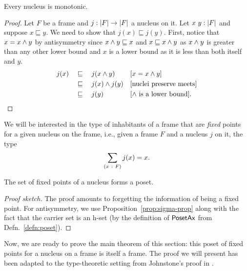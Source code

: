 \begin{prop}\label{prop:nucleus-mono}
  Every nucleus is monotonic.
\end{prop}
\begin{proof}
  Let $F$ be a frame and $j : \left| F \right| \rightarrow \left| F \right|$ a nucleus on it. Let
  $x~y:\left| F \right|$ and suppose $x \sqsubseteq y$. We need to show that $j(x) \sqsubseteq j(y)$. First,
  notice that $x = x \wedge y$ by antisymmetry since $x \wedge y \sqsubseteq x$ and $x \sqsubseteq
  x \wedge y$ as $x \wedge y$ is greater than any other lower bound and $x$ is a lower
  bound as it is less than both itself and $y$.
  \begin{align*}
    j(x) &\quad\sqsubseteq\quad j(x \wedge y)                 && [x = x \wedge y]                      \\
         &\quad\sqsubseteq\quad j(x) \wedge j(y)              && [\text{nuclei preserve meets}]         \\
         &\quad\sqsubseteq\quad {j(y)}                         && [\text{$\wedge$ is a lower bound}]  .
  \end{align*}
\end{proof}

We will be interested in the type of inhabitants of a frame that are \emph{fixed} points
for a given nucleus on the frame, i.e., given a frame $F$ and a nucleus $j$ on it,
the type $$\sum_{(x~:~F)} j(x) = x.$$

\begin{prop}
  The set of fixed points of a nucleus forms a poset.
\end{prop}
\begin{proof}[Proof sketch]
  The proof amounts to forgetting the information of being a fixed point. For
  antisymmetry, we use Proposition~\ref{prop:sigma-prop} along with the fact that the
  carrier set is an h-set (by the definition of $\mathsf{PosetAx}{}$ from
  Defn.~\ref{defn:poset}).
\end{proof}

Now, we are ready to prove the main theorem of this section: this poset of fixed points
for a nucleus on a frame is itself a frame. The proof we will present has been adapted to
the type-theoretic setting from Johnstone's proof in \cite[II.2.2, pg.~49]{stone-spaces}.

